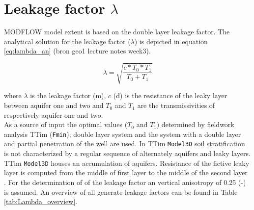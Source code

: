 \section{Leakage factor $\lambda$}
\label{section:Leakage_factor}

MODFLOW model extent is based on the double layer leakage factor. The analytical solution for the leakage factor ($\lambda$) is depicted in equation \ref{eq:lambda_an} (bron geo1 lecture notes week3). 

\begin{equation}
 \lambda = \sqrt{\frac{c * T_0 * T_1}{T_0 + T_1}}
 \label{eq:lambda_an}
\end{equation}  

where $\lambda$ is the leakage factor (m), $c$ (d) is the resistance of the leaky layer between aquifer one and two and $T_0$ and $T_1$ are the transmissivities of respectively aquifer one and two. \\

As a source of input the optimal values ($T_0$ and $T_1$) determined by fieldwork analysis TTim (\texttt{Fmin}); double layer system and the system with a double layer and partial penetration of the well are used. In TTim \texttt{Model3D} soil stratification is not characterized by a regular sequence of alternately aquifers and leaky layers. TTim \texttt{Model3D} houses an accumulation of aquifers. Resistance of the fictive leaky layer is computed from the middle of first layer to the middle of the second layer \citep{Bakker2013,Mishra2013}. For the determination of of the leakage factor an vertical anisotropy of 0.25 (-) is assumed. An overview of all generate leakage factors can be found in Table \ref{tab:Lambda_overview}. \\

